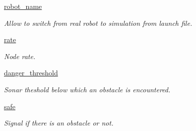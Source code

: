 \begin{DoxyCompactItemize}
\item 
\mbox{\label{classswitching__behavior__miro_1_1SwitchingBehavior_af878fdeb3e899baf9cd30e25e7998044}} 
\mbox{\hyperlink{classswitching__behavior__miro_1_1SwitchingBehavior_af878fdeb3e899baf9cd30e25e7998044}{robot\+\_\+name}}
\begin{DoxyCompactList}\small\item\em Allow to switch from real robot to simulation from launch file. \end{DoxyCompactList}\item 
\mbox{\label{classswitching__behavior__miro_1_1SwitchingBehavior_a1112b284035b50c5150a57caf8141a7a}} 
\mbox{\hyperlink{classswitching__behavior__miro_1_1SwitchingBehavior_a1112b284035b50c5150a57caf8141a7a}{rate}}
\begin{DoxyCompactList}\small\item\em Node rate. \end{DoxyCompactList}\item 
\mbox{\label{classswitching__behavior__miro_1_1SwitchingBehavior_a34015117ae228ea3fcc50aa3b8f7ad51}} 
\mbox{\hyperlink{classswitching__behavior__miro_1_1SwitchingBehavior_a34015117ae228ea3fcc50aa3b8f7ad51}{danger\+\_\+threshold}}
\begin{DoxyCompactList}\small\item\em Sonar theshold below which an obstacle is encountered. \end{DoxyCompactList}\item 
\mbox{\label{classswitching__behavior__miro_1_1SwitchingBehavior_aa9fb625bc0cacabc182259c708b76f07}} 
\mbox{\hyperlink{classswitching__behavior__miro_1_1SwitchingBehavior_aa9fb625bc0cacabc182259c708b76f07}{safe}}
\begin{DoxyCompactList}\small\item\em Signal if there is an obstacle or not. \end{DoxyCompactList}\item 
\mbox{\label{classswitching__behavior__miro_1_1SwitchingBehavior_a37695a832fc2eda0b7d95921567dd730}} 

\end{DoxyCompactItemize}

